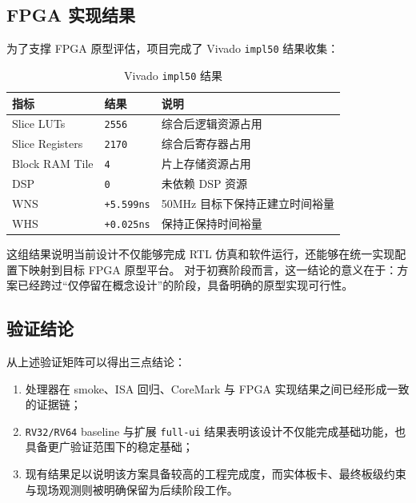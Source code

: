\subsection{FPGA 实现结果}

为了支撑 FPGA 原型评估，项目完成了 Vivado \texttt{impl50} 结果收集：
\begin{table}[H]
    \centering
    \small
    \caption{Vivado \texttt{impl50} 结果}
    \begin{tabularx}{0.92\textwidth}{L{0.32\textwidth} L{0.18\textwidth} Y}
        \toprule
        指标 & 结果 & 说明 \\
        \midrule
        Slice LUTs & \texttt{2556} & 综合后逻辑资源占用 \\
        Slice Registers & \texttt{2170} & 综合后寄存器占用 \\
        Block RAM Tile & \texttt{4} & 片上存储资源占用 \\
        DSP & \texttt{0} & 未依赖 DSP 资源 \\
        WNS & \texttt{+5.599ns} & 50MHz 目标下保持正建立时间裕量 \\
        WHS & \texttt{+0.025ns} & 保持正保持时间裕量 \\
        \bottomrule
    \end{tabularx}
\end{table}

这组结果说明当前设计不仅能够完成 RTL 仿真和软件运行，还能够在统一实现配置下映射到目标 FPGA 原型平台。
对于初赛阶段而言，这一结论的意义在于：方案已经跨过“仅停留在概念设计”的阶段，具备明确的原型实现可行性。

\subsection{验证结论}

从上述验证矩阵可以得出三点结论：
\begin{enumerate}
    \item 处理器在 smoke、ISA 回归、CoreMark 与 FPGA 实现结果之间已经形成一致的证据链；
    \item \texttt{RV32/RV64} baseline 与扩展 \texttt{full-ui} 结果表明该设计不仅能完成基础功能，也具备更广验证范围下的稳定基础；
    \item 现有结果足以说明该方案具备较高的工程完成度，而实体板卡、最终板级约束与现场观测则被明确保留为后续阶段工作。
\end{enumerate}
